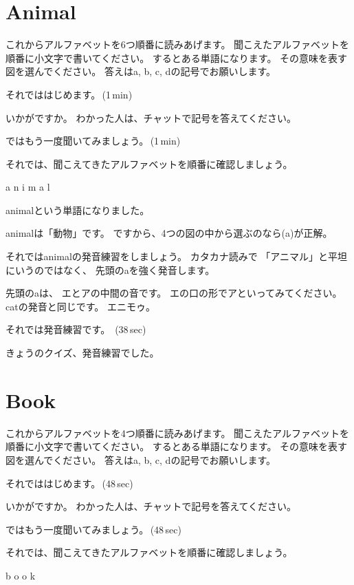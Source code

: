 \documentclass[12pt]{jlreq}
\newcommand{\myMouse}{%
  {\large \ComputerMouse}
}
\begin{document}
\section{Animal}
これからアルファベットを6つ順番に読みあげます。
聞こえたアルファベットを順番に小文字で書いてください。
するとある単語になります。
その意味を表す図を選んでください。
答えはa, b, c, dの記号でお願いします。


それでははじめます。\faVolumeUp\,(1\,min)

いかがですか。
わかった人は、チャットで記号を答えてください。

ではもう一度聞いてみましょう。\faVolumeUp\,(1\,min)

それでは、聞こえてきたアルファベットを順番に確認しましょう。{\large \ComputerMouse}

a
{\large \ComputerMouse}
n
{\large \ComputerMouse}
i
{\large \ComputerMouse}
m
{\large \ComputerMouse}
a
{\large \ComputerMouse}
l

animalという単語になりました。

animalは「動物」です。
ですから、4つの図の中から選ぶのなら(a)が正解。

それではanimalの発音練習をしましょう。
カタカナ読みで
「アニマル」と平坦にいうのではなく、
先頭のaを強く発音します。

先頭のaは、
エとアの中間の音です。
エの口の形でアといってみてください。
catの発音と同じです。
エニモゥ。

それでは発音練習です。
\faVolumeUp\,(38\,sec)

きょうのクイズ、発音練習でした。

\myMouse
\section{Book}
これからアルファベットを4つ順番に読みあげます。
聞こえたアルファベットを順番に小文字で書いてください。
するとある単語になります。
その意味を表す図を選んでください。
答えはa, b, c, dの記号でお願いします。


それでははじめます。\faVolumeUp\,(48\,sec)

いかがですか。
わかった人は、チャットで記号を答えてください。

ではもう一度聞いてみましょう。\faVolumeUp\,(48\,sec)

それでは、聞こえてきたアルファベットを順番に確認しましょう。{\large \ComputerMouse}

b
{\large \ComputerMouse}
o
{\large \ComputerMouse}
o
{\large \ComputerMouse}
k
\end{document}
